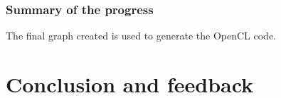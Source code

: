\documentclass[titlepage]{report}
\begin{document}
\subsection{Summary of the progress}
The final graph created is used to generate the OpenCL code.


\chapter{Conclusion and feedback}
\end{document}
